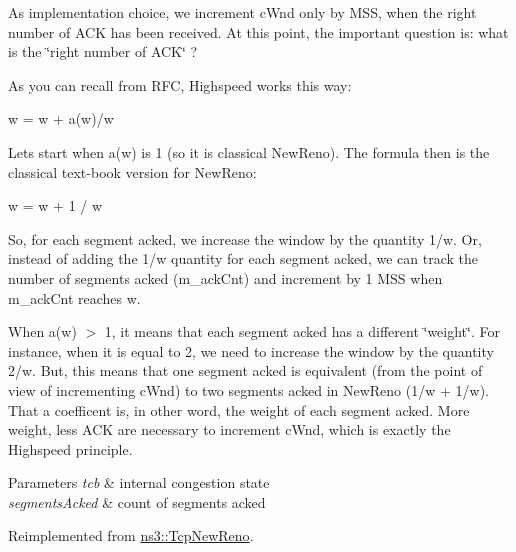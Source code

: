 As implementation choice, we increment c\+Wnd only by M\+SS, when the right number of A\+CK has been received. At this point, the important question is\+: what is the \char`\"{}right number of A\+C\+K\char`\"{} ?

As you can recall from R\+FC, Highspeed works this way\+: \begin{DoxyVerb}          w = w + a(w)/w
\end{DoxyVerb}


Let\textquotesingle{}s start when a(w) is 1 (so it is classical New\+Reno). The formula then is the classical text-\/book version for New\+Reno\+: \begin{DoxyVerb}          w = w + 1 / w
\end{DoxyVerb}


So, for each segment acked, we increase the window by the quantity 1/w. Or, instead of adding the 1/w quantity for each segment acked, we can track the number of segments acked (m\+\_\+ack\+Cnt) and increment by 1 M\+SS when m\+\_\+ack\+Cnt reaches w.

When a(w) $>$ 1, it means that each segment acked has a different \char`\"{}weight\char`\"{}. For instance, when it is equal to 2, we need to increase the window by the quantity 2/w. But, this means that one segment acked is equivalent (from the point of view of incrementing c\+Wnd) to two segments acked in New\+Reno (1/w + 1/w). That a coefficent is, in other word, the weight of each segment acked. More weight, less A\+CK are necessary to increment c\+Wnd, which is exactly the Highspeed principle.


\begin{DoxyParams}{Parameters}
{\em tcb} & internal congestion state \\
\hline
{\em segments\+Acked} & count of segments acked \\
\hline
\end{DoxyParams}


Reimplemented from \hyperlink{classns3_1_1TcpNewReno_a34a5eec0649a7b485852c74c825e14ba}{ns3\+::\+Tcp\+New\+Reno}.


